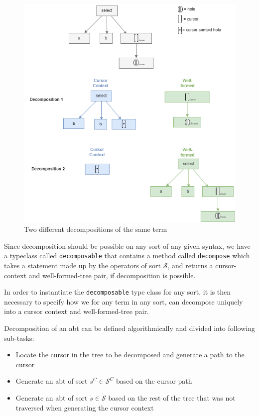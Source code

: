 \documentclass{article}
\begin{document}
\begin{figure}[H]
    \centering
    \includegraphics[width=\textwidth]{img/slq-decompose-ex.drawio.png}
    \caption{Two different decompositions of the same term}
    \label{fig:sql-decomp-ex}
\end{figure}

Since decomposition should be possible on any sort of any given syntax, we have a typeclass called \texttt{decomposable} that contains a method called \texttt{decompose} which takes a statement made up by the operators of sort $\mathcal{S}$, and returns a cursor-context and well-formed-tree pair, if decomposition is possible.

In order to instantiate the \texttt{decomposable} type class for any sort, it is then necessary to specify how we for any term in any sort, can decompose uniquely into a cursor context and well-formed-tree pair. 

Decomposition of an abt can be defined algorithmically and divided into following sub-tasks:
\begin{itemize}
    \item Locate the cursor in the tree to be decomposed and generate a path to the cursor
    \item Generate an abt of sort $s^C \in \mathcal{S}^C$ based on the cursor path
    \item Generate an abt of sort $\dot{s} \in \dot{\mathcal{S}}$ based on the rest of the tree that was not traversed when generating the cursor context
\end{itemize}
\end{document}
